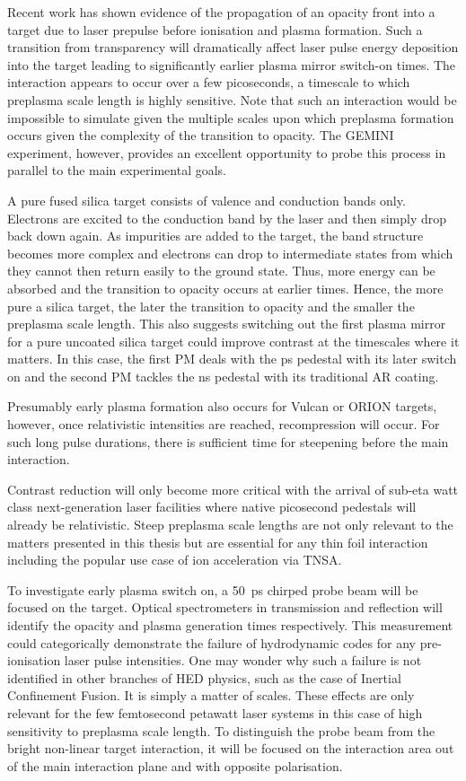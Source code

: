 Recent work has shown evidence of the propagation of an opacity front into a target due to laser prepulse before ionisation and plasma formation. Such a transition from transparency will dramatically affect laser pulse energy deposition into the target leading to significantly earlier plasma mirror switch-on times. The interaction appears to occur over a few picoseconds, a timescale to which preplasma scale length is highly sensitive. Note that such an interaction would be impossible to simulate given the multiple scales upon which preplasma formation occurs given the complexity of the transition to opacity. The GEMINI experiment, however, provides an excellent opportunity to probe this process in parallel to the main experimental goals.

A pure fused silica target consists of valence and conduction bands only. Electrons are excited to the conduction band by the laser and then simply drop back down again. As impurities are added to the target, the band structure becomes more complex and electrons can drop to intermediate states from which they cannot then return easily to the ground state. Thus, more energy can be absorbed and the transition to opacity occurs at earlier times. Hence, the more pure a silica target, the later the transition to opacity and the smaller the preplasma scale length. This also suggests switching out the first plasma mirror for a pure uncoated silica target could improve contrast at the timescales where it matters. In this case, the first PM deals with the ps pedestal with its later switch on and the second PM tackles the ns pedestal with its traditional AR coating.

Presumably early plasma formation also occurs for Vulcan or ORION targets, however, once relativistic intensities are reached, recompression will occur. For such long pulse durations, there is sufficient time for steepening before the main interaction. 

Contrast reduction will only become more critical with the arrival of sub-eta watt class next-generation laser facilities where native picosecond pedestals will already be relativistic. Steep preplasma scale lengths are not only relevant to the matters presented in this thesis but are essential for any thin foil interaction including the popular use case of ion acceleration via TNSA.

To investigate early plasma switch on, a \qty{50}{ps} chirped probe beam will be focused on the target. Optical spectrometers in transmission and reflection will identify the opacity and plasma generation times respectively. This measurement could categorically demonstrate the failure of hydrodynamic codes for any pre-ionisation laser pulse intensities. One may wonder why such a failure is not identified in other branches of HED physics, such as the case of Inertial Confinement Fusion. It is simply a matter of scales. These effects are only relevant for the few femtosecond petawatt laser systems in this case of high sensitivity to preplasma scale length.
To distinguish the probe beam from the bright non-linear target interaction, it will be focused on the interaction area out of the main interaction plane and with opposite polarisation.

